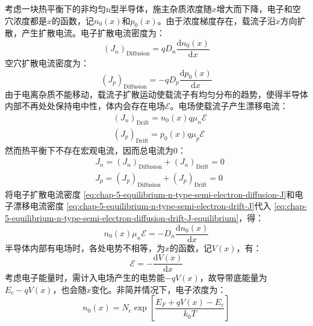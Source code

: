 考虑一块热平衡下的非均匀n型半导体，施主杂质浓度随$x$增大而下降，电子和空穴浓度都是$x$的函数，记$n_0(x)$和$p_0(x)$。由于浓度梯度存在，载流子沿$x$方向扩散，产生扩散电流。电子扩散电流密度为：
\begin{equation}
    (J_n)_\text{Diffusion}=qD_n\frac{\mathrm{d}n_0(x)}{\mathrm{d}x}\label{eq:chap-5-equilibrium-n-type-semi-electron-diffusion-J}
\end{equation}
空穴扩散电流密度为：
\begin{equation}
    (J_p)_\text{Diffusion}=-qD_p\frac{\mathrm{d}p_0(x)}{\mathrm{d}x}\label{eq:chap-5-equilibrium-n-type-semi-hole-diffusion-J}
\end{equation}
由于电离杂质不能移动，载流子扩散运动使载流子有均匀分布的趋势，使得半导体内部不再处处保持电中性，体内会存在电场$\mathscr{E}$。电场使载流子产生漂移电流：
\begin{align}
    &(J_n)_\text{Drift}=n_0(x)q\mu_n\mathscr{E}\label{eq:chap-5-equilibrium-n-type-semi-electron-drift-J}\\
    &(J_p)_\text{Drift}=p_0(x)q\mu_p\mathscr{E}\label{eq:chap-5-equilibrium-n-type-semi-hole-drift-J}
\end{align}
然而热平衡下不存在宏观电流，因而总电流为$0$：
\begin{align}
    &J_n=(J_n)_\text{Diffusion}+(J_n)_\text{Drift}=0\label{eq:chap-5-equilibrium-n-type-semi-electron-diffusion-drift-J-equilibrium}\\
    &J_p=(J_p)_\text{Diffusion}+(J_p)_\text{Drift}=0\label{eq:chap-5-equilibrium-n-type-semi-hole-diffusion-drift-J-equilibrium}
\end{align}
将电子扩散电流密度 \autoref{eq:chap-5-equilibrium-n-type-semi-electron-diffusion-J}和电子漂移电流密度 \autoref{eq:chap-5-equilibrium-n-type-semi-electron-drift-J}代入 \autoref{eq:chap-5-equilibrium-n-type-semi-electron-diffusion-drift-J-equilibrium}，得：
\begin{equation}
    n_0(x)\mu_n\mathscr{E}=-D_n\frac{\mathrm{d}n_0(x)}{\mathrm{d}x}\label{eq:chap-5-equilibrium-n-type-semi-electron-diffusion-drift-J-equilibrium-equation}
\end{equation}
半导体内部有电场时，各处电势不相等，为$x$的函数，记$V(x)$，有：
\begin{equation}
    \mathscr{E}=-\frac{\mathrm{d}V(x)}{\mathrm{d}x}\label{eq:chap-5-electrical-field-potential-relation}
\end{equation}
考虑电子能量时，需计入电场产生的电势能$-qV(x)$，故导带底能量为$E_c-qV(x)$，也会随$x$变化。非简并情况下，电子浓度为：
\begin{equation}
    n_0(x)=N_c\exp{\left[\frac{E_F+qV(x)-E_c}{k_0T}\right]}
\end{equation}
